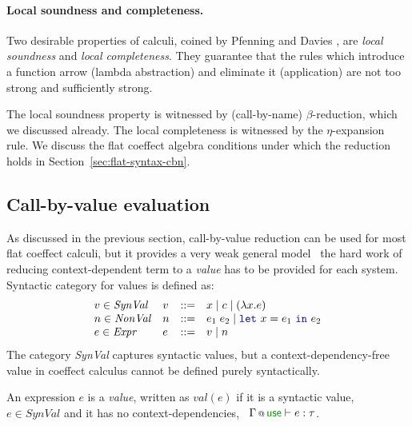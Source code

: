 \paragraph{Local soundness and completeness.}
Two desirable properties of calculi, coined by Pfenning and Davies \cite{logic-modal-reconstruction},
are \emph{local soundness} and \emph{local completeness}. They guarantee that the rules which 
introduce a function arrow (lambda abstraction) and eliminate it (application) are not too strong
and sufficiently strong.

The local soundness property is witnessed by (call-by-name) $\beta$-reduction, which we discussed
already. The local completeness is witnessed by the $\eta$-expansion rule. We discuss the flat
coeffect algebra conditions under which the reduction holds in Section~\ref{sec:flat-syntax-cbn}.


\subsection{Call-by-value evaluation}
\label{sec:flat-syntax-cbv}

As discussed in the previous section, call-by-value reduction can be used for most flat coeffect
calculi, but it provides a very weak general model \ie~the hard work of reducing context-dependent
term to a \emph{value} has to be provided for each system. Syntactic category for values is 
defined as:
%
\begin{equation*}
\begin{array}{llll}
v\in\mathit{SynVal}   & v &::=& x \sep c \sep (\lambda x.e)\\
n\in\mathit{NonVal}   & n &::=& e_1\;e_2 \sep \kvd{let}~x=e_1~\kvd{in}~e_2\\
e\in\mathit{Expr}     & e &::=& v \sep n 
\end{array}
\end{equation*}
%
The category \emph{SynVal} captures syntactic values, but a context-dependency-free value in 
coeffect calculus cannot be defined purely syntactically.

\begin{definition} 
An expression $e$ is a \emph{value}, written as $\textit{val}(e)$ if it is a syntactic value,
\ie~$e \in \mathit{SynVal}$ and it has no context-dependencies, \ie~$\coctx{\Gamma}{ \cunit } \vdash e : \tau$.
\end{definition}

